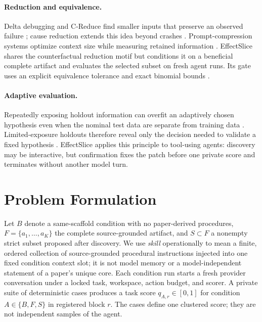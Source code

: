 \documentclass[letterpaper]{article} %
\begin{document}
\paragraph{Reduction and equivalence.}
Delta debugging and C-Reduce find smaller inputs that preserve an observed
failure \cite{zeller2002simplifying,regehr2012creduce}; cause reduction extends
this idea beyond crashes \cite{groce2016cause}.  Prompt-compression systems
optimize context size while measuring retained information
\cite{jiang2023llmlingua,pan2024llmlingua2}.  EffectSlice shares the
counterfactual reduction motif but conditions it on a beneficial complete
artifact and evaluates the selected subset on fresh agent runs.  Its gate uses
an explicit equivalence tolerance \cite{wellek2002equivalence} and exact
binomial bounds \cite{clopper1934binomial}.

\paragraph{Adaptive evaluation.}
Repeatedly exposing holdout information can overfit an adaptively chosen
hypothesis even when the nominal test data are separate from training data
\cite{dwork2015reusableholdout}.  Limited-exposure holdouts therefore reveal
only the decision needed to validate a fixed hypothesis
\cite{nakkiran2018genericholdout}.  EffectSlice applies this principle to
tool-using agents: discovery may be interactive, but confirmation fixes the
patch before one private score and terminates without another model turn.

\section{Problem Formulation}

Let $B$ denote a same-scaffold condition with no paper-derived procedures,
$F=\{a_1,\ldots,a_K\}$ the complete source-grounded artifact, and
$S\subset F$ a nonempty strict subset proposed after discovery.  We use
\emph{skill} operationally to mean a finite, ordered collection of
source-grounded procedural instructions injected into one fixed condition
context slot; it is not model memory or a model-independent statement of a
paper's unique core.  Each condition
run starts a fresh provider conversation under a locked task, workspace, action
budget, and scorer.  A private suite of
\EffectSliceHiddenChecksPerRun{} deterministic cases produces a task score
$q_{A,r}\in[0,1]$ for condition $A\in\{B,F,S\}$ in registered block $r$.
The cases define one clustered score; they are not independent samples of the
agent.
\end{document}
